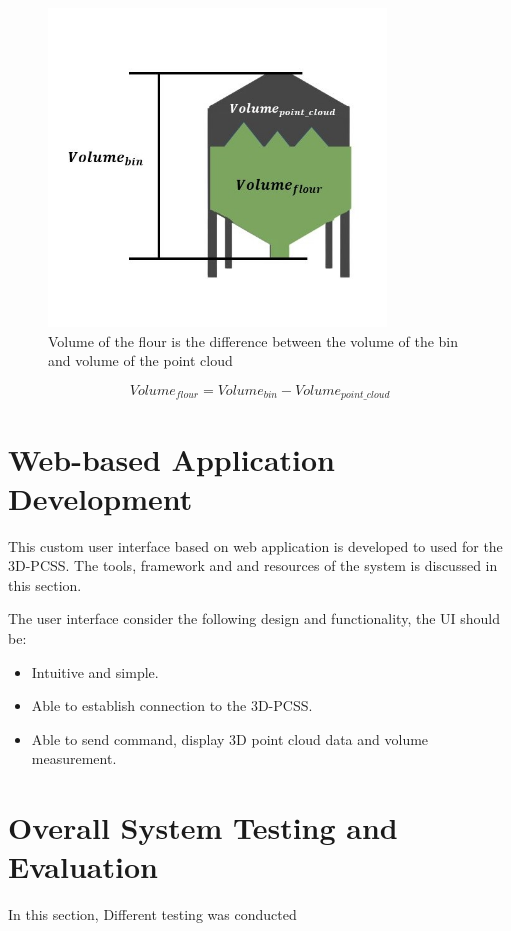 \begin{figure}[H]
	\centering
	\includegraphics[width=0.8\textwidth]{Figures/volume-estimation-figure}
	\caption{Volume of the flour is the difference between the volume of the bin and volume of the point cloud}
	\label{ch4:fig:volume-estimation-figure}
\end{figure}

\begin{equation}
	Volume_{flour} = Volume_{bin} - Volume_{point\_cloud}
	\label{ch4:eq:volume-estimation}
\end{equation}

\section{Web-based Application Development}
This custom user interface based on web application is developed to used for the 3D-PCSS. The tools, framework and and resources of the system is discussed in this section.

The user interface consider the following design and functionality, the UI should be:
\begin{itemize}
	\item Intuitive and simple.
	\item Able to establish connection to the 3D-PCSS.
	\item Able to send command, display 3D point cloud data and volume measurement.
\end{itemize}

\section{Overall System Testing and Evaluation}
\label{ch4:sec:Testing and Evaluation}
In this section, Different testing was conducted

